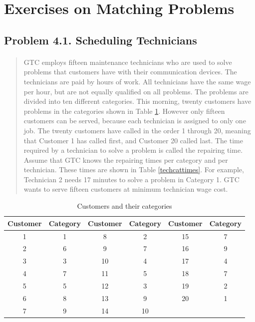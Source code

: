 \section{Exercises on Matching Problems}

\subsection{Problem 4.1. Scheduling Technicians}

\paragraph{}
\begin{quote}
GTC employs fifteen maintenance technicians who are used to solve problems that
customers have with their communication devices. The technicians are paid by hours
of work. All technicians have the same wage per hour, but are not equally qualified
on all problems. The problems are divided into ten different categories. This morning,
twenty customers have problems in the categories shown in Table \ref{cuscat}. However
only fifteen customers can be served, because each technician is assigned to only
one job. The twenty customers have called in the order 1 through 20, meaning that
Customer 1 has called first, and Customer 20 called last. The time required by a technician to solve a problem is called the repairing time. Assume that GTC knows the
repairing times per category and per technician. These times are shown in Table \ref{techcattimes}.
For example, Technician 2 needs 17 minutes to solve a problem in Category 1. GTC
wants to serve fifteen customers at minimum technician wage cost.\end{quote}

\begin{table}[H]
	\centering
	\caption{Customers and their categories}
	\begin{tabular}{cc||cc||cc}\hline
	Customer & Category & Customer & Category & Customer & Category \\ \hline
	1&1&8&2&15&7\\
	2&6&9&7&16&9\\
	3&3&10&4&17&4\\
	4&7&11&5&18&7\\
	5&5&12&3&19&2\\
	6&8&13&9&20&1\\
	7&9&14&10&&\\ \hline
	\end{tabular}
	\label{cuscat}
\end{table}

